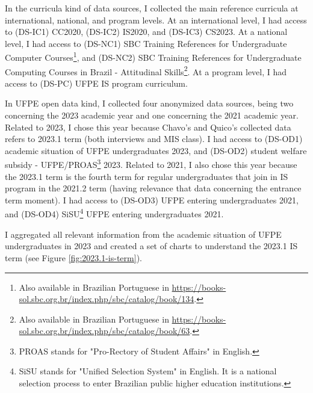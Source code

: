 In the curricula kind of data sources, I collected the main reference curricula at international, national, and program levels. At an international level, I had access to (\acrshort{DS-IC}1) \gls{CC2020}, (\acrshort{DS-IC}2) \gls{IS2020}, and (\acrshort{DS-IC}3) \gls{CS2023}. At a national level, I had access to (\acrshort{DS-NC}1) \gls{SBC} Training References for Undergraduate Computer Courses\footnote{Also available in Brazilian Portuguese in \url{https://books-sol.sbc.org.br/index.php/sbc/catalog/book/134}.}, and (\acrshort{DS-NC}2) \gls{SBC} Training References for Undergraduate Computing Courses in Brazil - Attitudinal Skills\footnote{Also available in Brazilian Portuguese in \url{https://books-sol.sbc.org.br/index.php/sbc/catalog/book/63}.}. At a program level, I had access to (\acrshort{DS-PC}) \gls{UFPE} \gls{IS} program curriculum.

In \gls{UFPE} open data kind, I collected four anonymized data sources, being two concerning the 2023 academic year and one concerning the 2021 academic year. Related to 2023, I chose this year because Chavo's and Quico's collected data refers to 2023.1 term (both interviews and \gls{MIS} class). I had access to (\acrshort{DS-OD}1) academic situation of \gls{UFPE} undergraduates 2023, and (\acrshort{DS-OD}2) student welfare subsidy - \gls{UFPE}/\gls{PROAS}\footnote{PROAS stands for "Pro-Rectory of Student Affairs" in English.} 2023. Related to 2021, I also chose this year because the 2023.1 term is the fourth term for regular undergraduates that join in \gls{IS} program in the 2021.2 term (having relevance that data concerning the entrance term moment). I had access to (\acrshort{DS-OD}3) \gls{UFPE} entering undergraduates 2021, and (\acrshort{DS-OD}4) \gls{SiSU}\footnote{SiSU stands for "Unified Selection System" in English. It is a national selection process to enter Brazilian public higher education institutions.} \gls{UFPE} entering undergraduates 2021.

I aggregated all relevant information from the academic situation of \gls{UFPE} undergraduates in 2023 and created a set of charts to understand the 2023.1 \gls{IS} term (see Figure \ref{fig:2023.1-is-term}).

